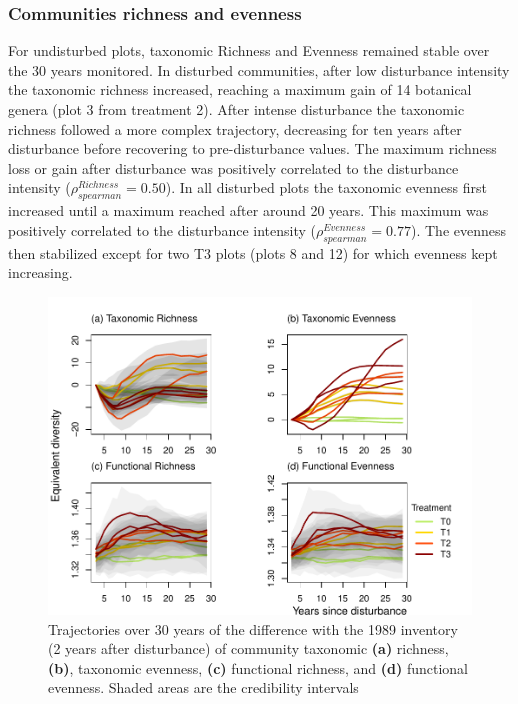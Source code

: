 \documentclass[
  11pt,
  french,
  A4paper,
  extrafontsizes,onecolumn,openright
  ]{memoir}
\begin{document}
\subsubsection{Communities richness and
evenness}\label{communities-richness-and-evenness}

For undisturbed plots, taxonomic Richness and Evenness remained stable
over the 30 years monitored. In disturbed communities, after low
disturbance intensity the taxonomic richness increased, reaching a
maximum gain of 14 botanical genera (plot 3 from treatment 2). After
intense disturbance the taxonomic richness followed a more complex
trajectory, decreasing for ten years after disturbance before recovering
to pre-disturbance values. The maximum richness loss or gain after
disturbance was positively correlated to the disturbance intensity
(\(\rho_{spearman}^{Richness}=0.50\)). In all disturbed plots the
taxonomic evenness first increased until a maximum reached after around
20 years. This maximum was positively correlated to the disturbance
intensity (\(\rho_{spearman}^{Evenness}=0.77\)). The evenness then
stabilized except for two T3 plots (plots 8 and 12) for which evenness
kept increasing.

\begin{figure}

{\centering \includegraphics[width=1\linewidth]{Manuscript_files/figure-latex/DivTaxo-1} 

}

\caption{Trajectories over 30 years of the difference with the 1989 inventory (2 years after disturbance) of community taxonomic \textbf{(a)} richness, \textbf{(b)}, taxonomic evenness, \textbf{(c)} functional richness, and \textbf{(d)} functional evenness. Shaded areas are the credibility intervals }\label{fig:DivTaxo}
\end{figure}
\end{document}
